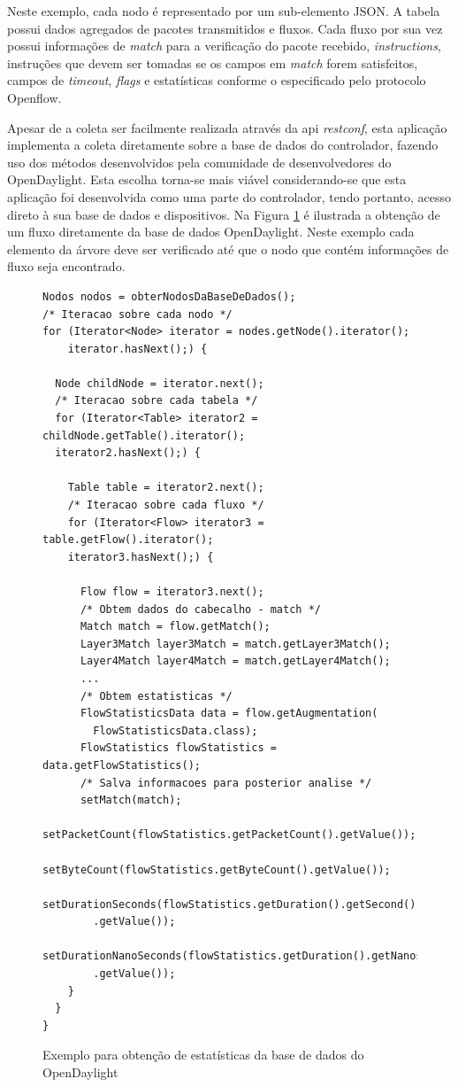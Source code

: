 Neste exemplo, cada nodo é representado por um sub-elemento JSON. A tabela possui dados agregados de pacotes transmitidos e fluxos. Cada fluxo por sua vez possui informações de \textit{match} para a verificação do pacote recebido, \textit{instructions}, instruções que devem ser tomadas se os campos em \textit{match} forem satisfeitos, campos de \textit{timeout}, \textit{flags} e estatísticas conforme o especificado pelo protocolo Openflow.

Apesar de a coleta ser facilmente realizada através da \gls{api} \textit{restconf}, esta aplicação implementa a coleta diretamente sobre a base de dados do controlador, fazendo uso dos métodos desenvolvidos pela comunidade de desenvolvedores do OpenDaylight. Esta escolha torna-se mais viável considerando-se que esta aplicação foi desenvolvida como uma parte do controlador, tendo portanto, acesso direto à sua base de dados e dispositivos. Na Figura \ref{cod:code-colection} é ilustrada a obtenção de um fluxo diretamente da base de dados OpenDaylight. Neste exemplo cada elemento da árvore deve ser verificado até que o nodo que contém informações de fluxo seja encontrado.

\begin{figure}[H]
  \centering
  \caption{Exemplo para obtenção de estatísticas da base de dados do OpenDaylight}
\begin{lstlisting}[belowskip=-0.05 \baselineskip]
Nodos nodos = obterNodosDaBaseDeDados();
/* Iteracao sobre cada nodo */
for (Iterator<Node> iterator = nodes.getNode().iterator(); 
    iterator.hasNext();) {
  
  Node childNode = iterator.next();
  /* Iteracao sobre cada tabela */
  for (Iterator<Table> iterator2 = childNode.getTable().iterator();
  iterator2.hasNext();) {
    
    Table table = iterator2.next();
    /* Iteracao sobre cada fluxo */
    for (Iterator<Flow> iterator3 = table.getFlow().iterator(); 
    iterator3.hasNext();) {
      
      Flow flow = iterator3.next();
      /* Obtem dados do cabecalho - match */
      Match match = flow.getMatch();
      Layer3Match layer3Match = match.getLayer3Match();
      Layer4Match layer4Match = match.getLayer4Match();
      ...
      /* Obtem estatisticas */
      FlowStatisticsData data = flow.getAugmentation(
        FlowStatisticsData.class);
      FlowStatistics flowStatistics = data.getFlowStatistics();
      /* Salva informacoes para posterior analise */
      setMatch(match);
      setPacketCount(flowStatistics.getPacketCount().getValue());
      setByteCount(flowStatistics.getByteCount().getValue());
      setDurationSeconds(flowStatistics.getDuration().getSecond()
        .getValue());
      setDurationNanoSeconds(flowStatistics.getDuration().getNanosecond()
        .getValue());
    }
  }
}
\end{lstlisting}
\label{cod:code-colection}
\end{figure}

